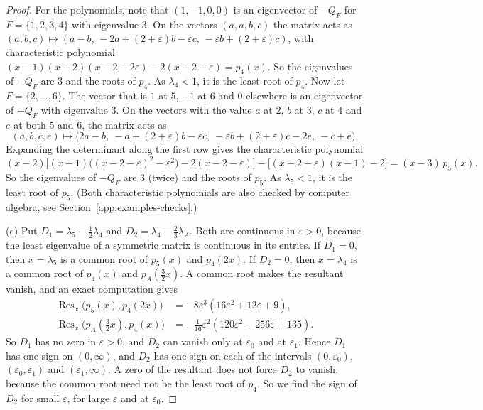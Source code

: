 \begin{proof}
For the polynomials, note that $(1,-1,0,0)$ is an eigenvector of $-Q_F$ for
$F=\{1,2,3,4\}$ with eigenvalue $3$. On the vectors $(a,a,b,c)$ the matrix
acts as
$(a,b,c)\mapsto(a-b,\,-2a+(2+\varepsilon)b-\varepsilon c,\,-\varepsilon b+(2+\varepsilon)c)$,
with characteristic polynomial
$(x-1)(x-2)(x-2-2\varepsilon)-2(x-2-\varepsilon)=p_4(x)$. So the eigenvalues
of $-Q_F$ are $3$ and the roots of $p_4$. As $\lambda_4<1$, it is the least
root of $p_4$. Now let $F=\{2,\dots,6\}$. The vector that is $1$ at $5$, $-1$
at $6$ and $0$ elsewhere is an eigenvector of $-Q_F$ with eigenvalue $3$. On
the vectors with the value $a$ at $2$, $b$ at $3$, $c$ at $4$ and $e$ at both
$5$ and $6$, the matrix acts as
\[
 (a,b,c,e)\mapsto\bigl(2a-b,\ -a+(2+\varepsilon)b-\varepsilon c,\
 -\varepsilon b+(2+\varepsilon)c-2e,\ -c+e\bigr).
\]
Expanding the determinant along the first row
gives the characteristic polynomial
\[
 (x-2)\bigl[(x-1)\bigl((x-2-\varepsilon)^2-\varepsilon^2\bigr)-2(x-2-\varepsilon)\bigr]
 -\bigl[(x-2-\varepsilon)(x-1)-2\bigr]=(x-3)\,p_5(x).
\]
So the eigenvalues of $-Q_F$ are $3$ (twice) and the roots of $p_5$. As
$\lambda_5<1$, it is the least root of $p_5$. (Both characteristic polynomials are
also checked by computer algebra, see Section~\ref{app:examples-checks}.)

(c) Put $D_1=\lambda_5-\frac12\lambda_4$ and
$D_2=\lambda_4-\frac23\lambda_A$. Both are continuous in $\varepsilon>0$,
because the least eigenvalue of a symmetric matrix is continuous in its
entries. If $D_1=0$, then $x=\lambda_5$ is a common root of $p_5(x)$ and
$p_4(2x)$. If $D_2=0$, then $x=\lambda_4$ is a common root of $p_4(x)$ and
$p_A(\frac32x)$. A common root makes the resultant vanish, and an exact
computation gives
\begin{align*}
 \operatorname{Res}_x\bigl(p_5(x),p_4(2x)\bigr)
 &=-8\varepsilon^3(16\varepsilon^2+12\varepsilon+9),\\
 \operatorname{Res}_x\bigl(p_A(\tfrac32x),p_4(x)\bigr)
 &=-\tfrac1{16}\varepsilon^2(120\varepsilon^2-256\varepsilon+135).
\end{align*}
So $D_1$ has no zero in $\varepsilon>0$, and $D_2$ can vanish only at
$\varepsilon_0$ and at $\varepsilon_1$. Hence $D_1$ has one sign on
$(0,\infty)$, and $D_2$ has one sign on each of the intervals
$(0,\varepsilon_0)$, $(\varepsilon_0,\varepsilon_1)$ and
$(\varepsilon_1,\infty)$. A zero of the resultant does not force $D_2$ to
vanish, because the common root need not be the least root of $p_4$. So we find
the sign of $D_2$ for small $\varepsilon$, for large $\varepsilon$ and at
$\varepsilon_0$.


\end{proof}
